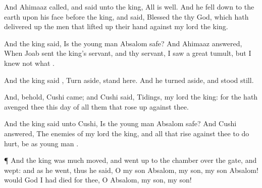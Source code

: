 {And
Ahimaaz
called, and
said unto the
king, All is
well. And he fell
down to the
earth upon his
face before the
king, and
said,
Blessed
{} the
{} thy
God, which hath delivered
up the
men that lifted
up their
hand against my
lord the
king.

And the
king
said, Is the young
man
Absalom
safe? And
Ahimaaz
answered, When
Joab
sent the
king’s
servant, and
{} thy
servant, I
saw a
great
tumult, but I
knew not what
{}.

And the
king
said
{}, Turn
aside,
{}
stand
here. And he turned
aside, and stood
still.

And, behold,
Cushi
came; and
Cushi
said,
Tidings, my
lord the
king: for the
{} hath
avenged thee this
day of all
them that rose
up against thee.

And the
king
said unto
Cushi, Is the young
man
Absalom
safe? And
Cushi
answered, The
enemies of my
lord the
king, and all that
rise against thee to do
{}
hurt, be as
{} young
man
{}.


\par }{\PP {}¶ And the
king was much
moved, and went
up to the
chamber over the
gate, and
wept: and as he
went, thus he
said, O my
son
Absalom, my
son, my
son
Absalom! would God I had
died for
thee, O
Absalom, my
son, my
son!




\par }
